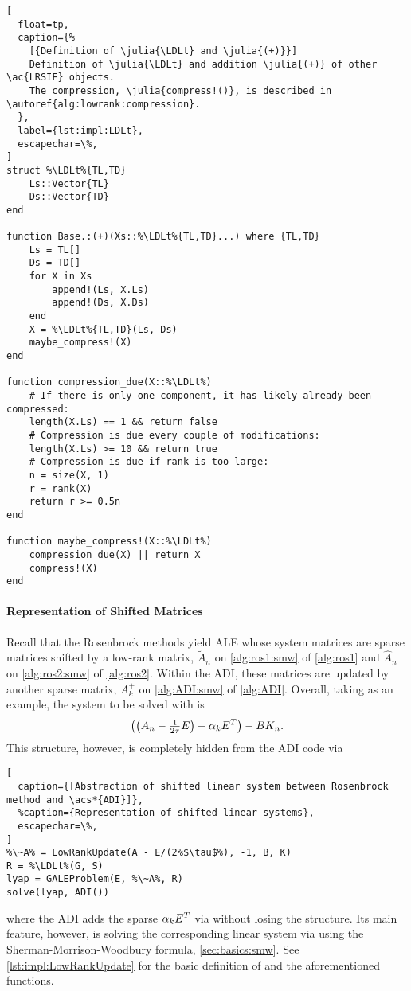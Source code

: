 \begin{lstlisting}[
  float=tp,
  caption={%
    [{Definition of \julia{\LDLt} and \julia{(+)}}]
    Definition of \julia{\LDLt} and addition \julia{(+)} of other \ac{LRSIF} objects.
    The compression, \julia{compress!()}, is described in \autoref{alg:lowrank:compression}.
  },
  label={lst:impl:LDLt},
  escapechar=\%,
]
struct %\LDLt%{TL,TD}
    Ls::Vector{TL}
    Ds::Vector{TD}
end

function Base.:(+)(Xs::%\LDLt%{TL,TD}...) where {TL,TD}
    Ls = TL[]
    Ds = TD[]
    for X in Xs
        append!(Ls, X.Ls)
        append!(Ds, X.Ds)
    end
    X = %\LDLt%{TL,TD}(Ls, Ds)
    maybe_compress!(X)
end

function compression_due(X::%\LDLt%)
    # If there is only one component, it has likely already been compressed:
    length(X.Ls) == 1 && return false
    # Compression is due every couple of modifications:
    length(X.Ls) >= 10 && return true
    # Compression is due if rank is too large:
    n = size(X, 1)
    r = rank(X)
    return r >= 0.5n
end

function maybe_compress!(X::%\LDLt%)
    compression_due(X) || return X
    compress!(X)
end
\end{lstlisting}

\paragraph{Representation of Shifted Matrices}

Recall that the Rosenbrock methods yield \ac{ALE} whose system matrices are sparse matrices shifted by a low-rank matrix,
\cf $\tilde A_n$ on \autoref{alg:ros1:smw} of \autoref{alg:ros1} and $\hat A_n$ on \autoref{alg:ros2:smw} of \autoref{alg:ros2}.
Within the \ac{ADI}, these matrices are updated by another sparse matrix,
\cf $A^+_k$ on \autoref{alg:ADI:smw} of \autoref{alg:ADI}.
Overall, taking  as an example,
the system to be solved with is
\begin{equation}
  \big(\big( A_n - \tfrac{1}{2\tau} E \big) + \alpha_k E^T \big) - B K_n
  .
\end{equation}
This structure, however, is completely hidden from the \ac{ADI} code via
\begin{lstlisting}[
  caption={[Abstraction of shifted linear system between Rosenbrock method and \acs*{ADI}]},
  %caption={Representation of shifted linear systems},
  escapechar=\%,
]
%\~A% = LowRankUpdate(A - E/(2%$\tau$%), -1, B, K)
R = %\LDLt%(G, S)
lyap = GALEProblem(E, %\~A%, R)
solve(lyap, ADI())
\end{lstlisting}
where the \ac{ADI} adds the sparse $\alpha_k E^T$ via \julia{(+)} without losing the  structure.
Its main feature, however, is solving the corresponding linear system via \julia{(\textbackslash)}
using the Sherman-Morrison-Woodbury formula,
\cf \autoref{sec:basics:smw}.
See \autoref{lst:impl:LowRankUpdate} for the basic definition of  and the aforementioned functions.

